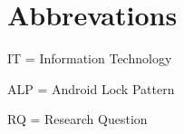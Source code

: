 \section*{Abbrevations}

	IT = Information Technology

	ALP = Android Lock Pattern
	
	RQ = Research Question